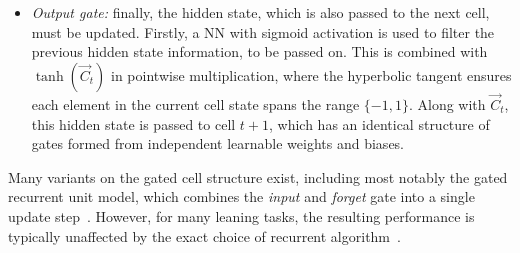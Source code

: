 \begin{itemize}
    \item \textit{Output gate:} finally, the hidden state, which is also passed to the next cell, must be updated. Firstly, a NN with sigmoid activation is used to filter the previous hidden state information, to be passed on. This is combined with $\tanh(\vec{C}_{t})$ in pointwise multiplication, where the hyperbolic tangent ensures each element in the current cell state spans the range $\{-1,1\}$. Along with $\vec{C}_{t}$, this hidden state is passed to cell $t+1$, which has an identical structure of gates formed from independent learnable weights and biases. %
\end{itemize}

\noindent Many variants on the gated cell structure exist, including most notably the gated recurrent unit model, which combines the \textit{input} and \textit{forget} gate into a single update step~\cite{GRUs}. However, for many leaning tasks, the resulting performance is typically unaffected by the exact choice of recurrent algorithm~\cite{LSTMPerformances}.

